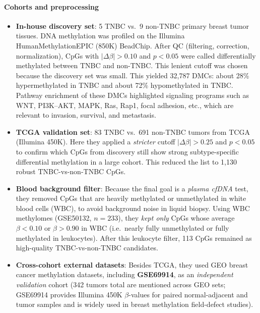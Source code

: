 \documentclass[10pt]{extarticle}
\begin{document}
\paragraph{Cohorts and preprocessing}
\begin{itemize}[label=-]
    \item \textbf{In-house discovery set}: 5 TNBC vs.\ 9 non-TNBC primary breast tumor tissues. DNA methylation was profiled on the Illumina HumanMethylationEPIC (850K) BeadChip. After QC (filtering, correction, normalization), CpGs with \(|\Delta \beta| > 0.10\) and \(p < 0.05\) were called differentially methylated between TNBC and non-TNBC. This lenient cutoff was chosen because the discovery set was small. This yielded 32{,}787 DMCs: about 28\% hypermethylated in TNBC and about 72\% hypomethylated in TNBC. Pathway enrichment of these DMCs highlighted signaling programs such as WNT, PI3K--AKT, MAPK, Ras, Rap1, focal adhesion, etc., which are relevant to invasion, survival, and metastasis. 
    \item \textbf{TCGA validation set}: 83 TNBC vs.\ 691 non-TNBC tumors from TCGA (Illumina 450K). Here they applied a \textit{stricter} cutoff \(|\Delta \beta| > 0.25\) and \(p < 0.05\) to confirm which CpGs from discovery still show strong subtype-specific differential methylation in a large cohort. This reduced the list to 1{,}130 robust TNBC-vs-non-TNBC CpGs. 
    \item \textbf{Blood background filter}: Because the final goal is a \textit{plasma cfDNA} test, they removed CpGs that are heavily methylated or unmethylated in white blood cells (WBC), to avoid background noise in liquid biopsy. Using WBC methylomes (GSE50132, \(n=233\)), they \emph{kept only} CpGs whose average \(\beta < 0.10\) or \(\beta > 0.90\) in WBC (i.e.\ nearly fully unmethylated or fully methylated in leukocytes). After this leukocyte filter, 113 CpGs remained as high-quality TNBC-vs-non-TNBC candidates. 
    \item \textbf{Cross-cohort external datasets}: Besides TCGA, they used GEO breast cancer methylation datasets, including \textbf{GSE69914}, as an \textit{independent validation} cohort (342 tumors total are mentioned across GEO sets; GSE69914 provides Illumina 450K \(\beta\)-values for paired normal-adjacent and tumor samples and is widely used in breast methylation field-defect studies). 
\end{itemize}
\end{document}
